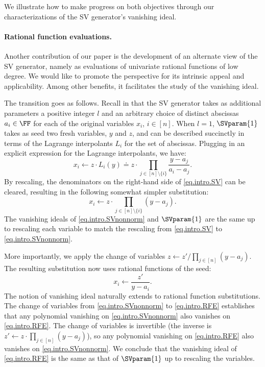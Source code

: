 \documentclass{toc}
\begin{document}
We illustrate how to make progress on both objectives through our
characterizations of the SV generator's vanishing ideal.

\paragraph{Rational function evaluations.}
Another contribution of our paper is the development of an alternate view of
the SV generator,
namely as evaluations of univariate rational functions of low degree.
We would like to promote the perspective for its intrinsic appeal and 
applicability.
Among other benefits, it facilitates the study of the vanishing ideal.

The transition goes as follows.
Recall in  that the SV generator takes as additional parameters a positive integer $l$
and an arbitrary choice of distinct abscissas $a_i \in \FF$ for each of the original variables $x_i$, \(i\in[n]\).
When \(l=1\), $\SVparam{1}$ takes as seed two fresh variables, $y$ and $z$, and can be described succinctly in terms of the Lagrange interpolants $L_i$ for the set of abscissas. Plugging in an explicit expression for the Lagrange interpolants, we have:
\begin{equation}\label{eq.intro.SV}
  x_i \gets z \cdot L_i(y) \doteq
  z \cdot \prod_{j\in [n]\setminus\{i\}} \frac{y - a_{j}}{a_i - a_{j}}.
\end{equation}
By rescaling,
the denominators on the right-hand side of \eqref{eq.intro.SV} can be cleared,
resulting in the following somewhat simpler substitution:
\begin{equation}\label{eq.intro.SVnonnorm}
  x_i \gets z \cdot
    \prod_{j\in [n]\setminus\{i\}} (y - a_{j}).
\end{equation}
The vanishing ideals of \eqref{eq.intro.SVnonnorm} and $\SVparam{1}$ are the
same up to rescaling each variable to match the rescaling from
\eqref{eq.intro.SV} to \eqref{eq.intro.SVnonnorm}.

More importantly,
we apply the change of variables
$z \gets z' / \prod_{j \in [n]} (y - a_j)$. The
resulting substitution now uses rational functions of the seed:
\begin{equation}\label{eq.intro.RFE}
  x_i \gets \frac{z'}{y-a_i}.
\end{equation}
The notion of vanishing ideal naturally extends to rational function
substitutions.
The change of variables from \eqref{eq.intro.SVnonnorm} to
\eqref{eq.intro.RFE} establishes that any polynomial vanishing on
\eqref{eq.intro.SVnonnorm} also vanishes on \eqref{eq.intro.RFE}.
The change of variables is invertible
(the inverse is $z' \gets z \cdot \prod_{j\in [n]} (y-a_j)$),
so any polynomial vanishing on \eqref{eq.intro.RFE} also vanishes on
\eqref{eq.intro.SVnonnorm}.
We conclude that the vanishing ideal of \eqref{eq.intro.RFE} is the same as
that of $\SVparam{1}$ up to rescaling the variables.
\end{document}
